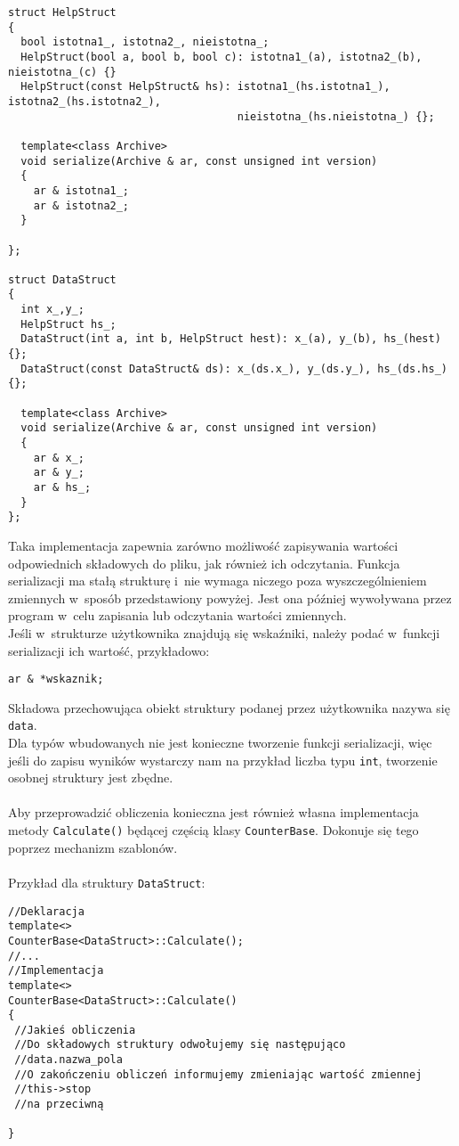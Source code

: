 \documentclass[a4paper]{article}
\begin{document}
\begin{verbatim}
struct HelpStruct
{
  bool istotna1_, istotna2_, nieistotna_;
  HelpStruct(bool a, bool b, bool c): istotna1_(a), istotna2_(b), nieistotna_(c) {}
  HelpStruct(const HelpStruct& hs): istotna1_(hs.istotna1_), istotna2_(hs.istotna2_), 
                                    nieistotna_(hs.nieistotna_) {};

  template<class Archive>
  void serialize(Archive & ar, const unsigned int version)
  {
    ar & istotna1_;
    ar & istotna2_;
  }
  
};

struct DataStruct
{
  int x_,y_;
  HelpStruct hs_;
  DataStruct(int a, int b, HelpStruct hest): x_(a), y_(b), hs_(hest) {};
  DataStruct(const DataStruct& ds): x_(ds.x_), y_(ds.y_), hs_(ds.hs_) {};

  template<class Archive>
  void serialize(Archive & ar, const unsigned int version)
  {
    ar & x_;
    ar & y_;
    ar & hs_;
  }
};

\end{verbatim}
Taka implementacja zapewnia zarówno możliwość zapisywania wartości odpowiednich składowych do pliku, jak również ich odczytania.
Funkcja serializacji ma stałą strukturę i~nie wymaga niczego poza wyszczególnieniem zmiennych w~sposób przedstawiony powyżej.
Jest ona później wywoływana przez program w~celu zapisania lub odczytania wartości zmiennych.\\
Jeśli w~strukturze użytkownika znajdują się wskaźniki, należy podać w~funkcji serializacji ich wartość, przykładowo:
\begin{verbatim}
ar & *wskaznik;
\end{verbatim}
Składowa przechowująca obiekt struktury podanej przez użytkownika nazywa się \texttt{data}.\\
Dla typów wbudowanych nie jest konieczne tworzenie funkcji serializacji, więc jeśli do zapisu wyników wystarczy nam na przykład liczba typu \texttt{int}, tworzenie osobnej struktury jest zbędne.\\
~\\
Aby przeprowadzić obliczenia konieczna jest również własna implementacja metody \texttt{Calculate()} będącej częścią klasy \texttt{CounterBase}. 
Dokonuje się tego poprzez mechanizm szablonów.\\
~\\
Przykład dla struktury \texttt{DataStruct}:
\begin{verbatim}
//Deklaracja
template<>
CounterBase<DataStruct>::Calculate();
//...
//Implementacja
template<>
CounterBase<DataStruct>::Calculate()
{
 //Jakieś obliczenia
 //Do składowych struktury odwołujemy się następująco
 //data.nazwa_pola
 //O zakończeniu obliczeń informujemy zmieniając wartość zmiennej
 //this->stop
 //na przeciwną

} 
\end{verbatim}
\end{document}
